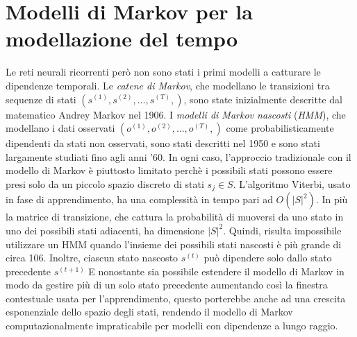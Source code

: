 \section{Modelli di Markov per la modellazione del tempo}
Le reti neurali ricorrenti per\`o non sono stati i primi modelli a catturare le dipendenze temporali.
Le \emph{catene di Markov}, che modellano le transizioni tra sequenze di stati $(s^{(1)}, s^{(2)}, \dots, s^{(T)},)$, sono state inizialmente descritte dal matematico Andrey Markov nel 1906.
I \emph{modelli di Markov nascosti} (\emph{HMM}), che modellano i dati osservati $(o^{(1)}, o^{(2)}, \dots, o^{(T)},)$ come probabilisticamente dipendenti da stati non osservati, sono stati descritti nel 1950 e sono stati largamente studiati fino agli anni '60.
In ogni caso, l'approccio tradizionale con il modello di Markov \`e piuttosto limitato perch\`e i possibili stati possono essere presi solo da un piccolo spazio discreto di stati $ s_j \in S$.
L'algoritmo Viterbi, usato in fase di apprendimento, ha una complessit\`a in tempo pari ad $O(|S|^2)$.
In pi\`u la matrice di transizione, che cattura la probabilit\`a di muoversi da uno stato in uno dei possibili stati adiacenti, ha dimensione $|S|^2$.
Quindi, risulta impossibile utilizzare un HMM quando l'insieme dei possibili stati nascosti \`e pi\`u grande di circa 106.
Inoltre, ciascun stato nascosto $s^{(t)}$ pu\`o dipendere solo dallo stato precedente $s^{(t+1)}$
E nonostante sia possibile estendere il modello di Markov in modo da gestire pi\`u di un solo stato precedente aumentando cos\`i la finestra contestuale usata per l'apprendimento, questo porterebbe anche ad una crescita esponenziale dello spazio degli stati, rendendo il modello di Markov computazionalmente impraticabile per modelli con dipendenze a lungo raggio.

